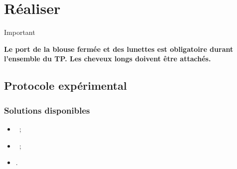 \documentclass[a4paper, 11pt, final, garamond]{book}
\begin{document}
\section{Réaliser}

\begin{NCror}[width=\linewidth]{Important}
    \begin{center}
        \bfseries
        Le port de la blouse fermée et des lunettes est obligatoire durant
        l'ensemble du TP. Les cheveux longs doivent être attachés.
    \end{center}
\end{NCror}

\subsection{Protocole expérimental}

\subsubsection{Solutions disponibles}
\begin{itemize}
    \item {}~;
        \vspace{-15pt}
    \item {}~;
        \vspace{-15pt}
    \item {}.
\end{itemize}
\end{document}
